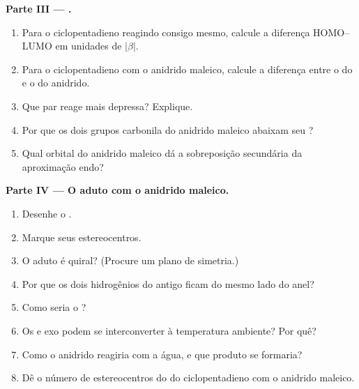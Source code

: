 \begin{problem}
\medskip
\noindent\textbf{Parte III --- .}
\begin{enumerate}[resume]
  \item Para o ciclopentadieno reagindo consigo mesmo, calcule a diferença
        HOMO--LUMO em unidades de $|\beta|$.
  \item Para o ciclopentadieno com o anidrido maleico, calcule a diferença entre
        o  do  e o  do anidrido.
  \item Que par reage mais depressa? Explique.
  \item Por que os dois grupos carbonila do anidrido maleico abaixam seu ?
  \item Qual orbital do anidrido maleico dá a sobreposição secundária da
        aproximação endo?
\end{enumerate}

\medskip
\noindent\textbf{Parte IV --- O aduto com o anidrido maleico.}
\begin{enumerate}[resume]
  \item Desenhe o .
  \item Marque seus estereocentros.
  \item O aduto é quiral? (Procure um plano de simetria.)
  \item Por que os dois hidrogênios do antigo  ficam do mesmo lado do anel?
  \item Como seria o ?
  \item Os  e exo podem se interconverter à temperatura ambiente? Por quê?
  \item Como o anidrido reagiria com a água, e que produto se formaria?
  \item Dê o número de estereocentros do  do ciclopentadieno com o
        anidrido maleico.
\end{enumerate}
\end{problem}
